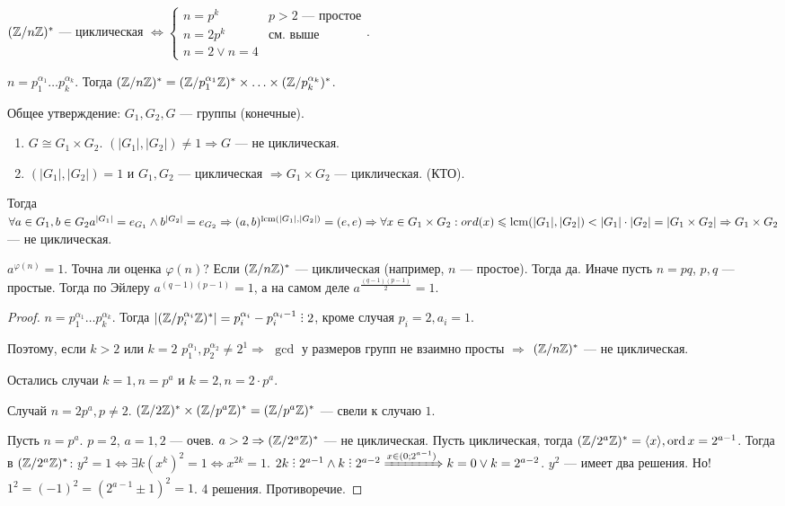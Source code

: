   \begin{theorem}
      $(\mathbb{Z} / n\mathbb{Z})^*$ --- циклическая  $\iff \begin{cases} n=p^k & p>2\text{ --- простое} \\ n = 2 p^k & \text{см. выше} \\ n = 2 \lor n = 4\end{cases}$.
 \end{theorem}
 \slashn

    $n = p_1^{\alpha_1} \ldots p_k^{\alpha_k}$. Тогда $(\mathbb{Z} / n \mathbb{Z})^* = (\mathbb{Z} / p_1^{\alpha_1} \mathbb{Z})^* \times \ldots \times (\mathbb{Z} / p_k ^{\alpha_k})^*$. 

    Общее утверждение:  $G_1, G_2, G$ --- группы (конечные). 
    \begin{enumerate}
        \item $G \cong G_1 \times G_2$. $(|G_1|, |G_2|) \neq 1 \Rightarrow G$ --- не циклическая.
        \item $(|G_1|, |G_2|) = 1$ и $G_1, G_2$ --- циклическая $\Rightarrow G_1 \times G_2$ --- циклическая. (КТО).
    \end{enumerate}

    Тогда $\forall a \in G_1, b \in G_2 a^{|G_1|} = e_{G_1} \land b^{|G_2|} = e_{G_2} \Rightarrow (a, b)^{\operatorname*{lcm}(|G_1|, |G_2|)} = (e, e) \Rightarrow \forall x \in G_1 \times G_2: ord(x) \leqslant \operatorname*{lcm}(|G_1|, |G_2|) < |G_1| \cdot |G_2| = |G_1\times G_2| \Rightarrow G_1 \times G_2$ --- не циклическая.
\begin{remark}
    $a^{\varphi(n)} = 1$. Точна ли оценка  $\varphi(n)$? Если  $(\mathbb{Z} / n\mathbb{Z})^*$ --- циклическая (например, $n$ --- простое). Тогда да. Иначе пусть $n = pq$,  $p,q$ --- простые. Тогда  по Эйлеру $a^{(q-1)(p-1)} = 1$, а на самом деле  $a^{\frac{(q-1)(p-1)}{2}} = 1$. 
\end{remark}
\begin{proof}
    $n = p_1^{\alpha_1} \ldots p_k^{\alpha_k}$. Тогда $|(\Z / p_i^{\alpha_i} \Z)^*| = p_i^{\alpha_i} - p_i^{\alpha_i - 1} \divby 2$, кроме случая  $p_i = 2, a_i = 1$. 

    Поэтому, если  $k > 2$ или  $k = 2$ $p_1^{\alpha_1}, p_2^{\alpha_2} \neq 2^1 \Rightarrow$ $\gcd$ у размеров групп не взаимно просты  $\Rightarrow$  $(\mathbb{Z} / n\mathbb{Z})^*$ --- не циклическая. 
    
    Остались случаи  $k=1, n=p^a$ и $k=2, n = 2 \cdot p^a$.

    Случай  $n = 2p^a, p \neq 2$.  $(\mathbb{Z} / 2 \mathbb{Z})^* \times (\mathbb{Z} / p^a \mathbb{Z})^* = (\mathbb{Z} / p^a \mathbb{Z})^*$ --- свели к случаю  $1$.

    Пусть  $n = p^a$.  $p=2$,  $a = 1,2$ --- очев.  $a>2 \Rightarrow (\mathbb{Z} / 2^a \mathbb{Z})^*$ --- не циклическая. Пусть циклическая, тогда $(\mathbb{Z} / 2^a \mathbb{Z})^* = \langle x \rangle, \operatorname{ord} x = 2^{a-1}$. Тогда  в $(\mathbb{Z} / 2^a \mathbb{Z})^*$:  $y^2 = 1 \iff \exists k (x^k)^2 = 1 \iff x^{2k} = 1$. $2k \divby 2^{a-1} \land k \divby 2^{a-2} \xRightarrow{x \in (0; 2^{a - 1})} k = 0 \lor k = 2^{a-2}$. $y^2$ --- имеет два решения. Но! $1^2 = (-1)^2 = (2^{a - 1} \pm 1)^2 = 1$. 4 решения. Противоречие.
\end{proof}

